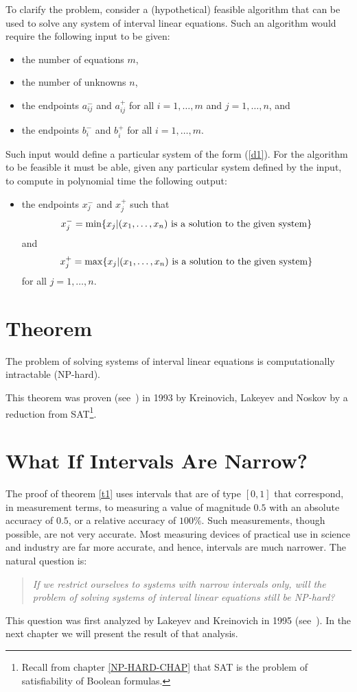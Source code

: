 To clarify the problem, consider a (hypothetical) feasible algorithm that can
be used to solve any system of interval linear equations.  Such an algorithm
would require the following input to be given:
\begin{itemize}
\item the number of equations $m$,
\item the number of unknowns $n$,
\item the endpoints $a_{ij}^-$ and $a_{ij}^+$ for all $i=1,\ldots,m$ and
      $j=1,\ldots,n$, and
\item the endpoints $b_i^-$ and $b_i^+$ for all $i=1,\ldots,m$.
\end{itemize}
Such input would define a particular system of the form (\ref{d1}).  For the
algorithm to be feasible it must be able, given any particular system
defined by the input, to compute in polynomial time the following output:
\begin{itemize}
\item the endpoints $x_j^-$ and $x_j^+$ such that
$$
  x_j^-=\min\{x_j|(x_1,\ldots,x_n)
   {\rm\ is\ a\ solution\ to\ the\ given\ system}\}
$$
and
$$
  x_j^+=\max\{x_j|(x_1,\ldots,x_n)
   {\rm\ is\ a\ solution\ to\ the\ given\ system}\}
$$
for all $j=1,\ldots,n$.
\end{itemize}

\section{Theorem}

\begin{theorem}
The problem of solving systems of interval linear equations is computationally
intractable (\/{\rm NP}-hard). \label{t1}
\end{theorem}

\medskip

\noindent
This theorem was proven (see~\cite{Kreinovich1993}) in 1993 by Kreinovich,
Lakeyev and Noskov by a reduction from SAT\footnote{Recall from chapter
\ref{NP-HARD-CHAP} that SAT is the problem of satisfiability of Boolean
formulas.}.

\section{What If Intervals Are Narrow?}
The proof of theorem \ref{t1} uses intervals that are of type $[0,1]$ that
correspond, in measurement terms, to measuring a value of magnitude $0.5$ 
with an absolute accuracy of $0.5$, or a relative accuracy of 
$100\%$. Such measurements, though possible, are not very accurate. 
Most measuring devices of practical use in science and industry are far more
accurate, and hence, intervals are much narrower.  The natural question is:


\begin{quote}
{\it If we restrict ourselves to systems with narrow intervals only, will the
problem of solving systems of interval linear equations still be\/
{\rm NP}-hard?}
\end{quote}

\noindent
This question was first analyzed by Lakeyev and Kreinovich in 1995 
(see~\cite{Lakeyev1995}).  In the next chapter we will present the result of 
that analysis.
